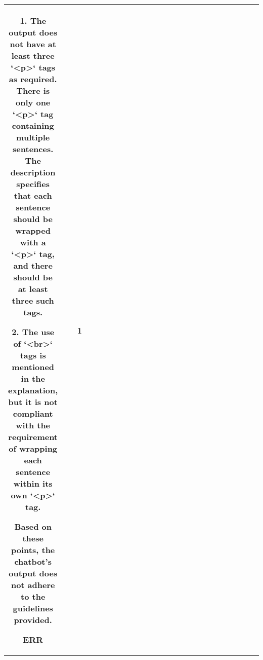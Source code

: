 \begin{table}[h!]
\begin{tabular}{|c|c|c|c|c|c|c|c|c|c|}
1. The output does not have at least three `<p>` tags as required. There is only one `<p>` tag containing multiple sentences. The description specifies that each sentence should be wrapped with a `<p>` tag, and there should be at least three such tags.

2. The use of `<br>` tags is mentioned in the explanation, but it is not compliant with the requirement of wrapping each sentence within its own `<p>` tag.

Based on these points, the chatbot's output does not adhere to the guidelines provided.

ERR & 1\\
\hline
149fa06 & b70fdc4 &  &  & llama3.2:1b & To be, or not to be, that is the question. Whether 'tis nobler in the mind to suffer. The slings and arrows of outrageous fortune. & Here is the paragraph with individual sentences wrapped in <p> tags, followed by one <strong> tag and multiple <em> tags:

<p>To be, or not to be, that is the question.</strong><p> Whether 'tis nobler in the mind to suffer. <em>This is a philosophical concern</em></p>

<p>The slings and arrows of outrageous fortune.</strong><p>Take them all and none.</em></p>
 
<p>To be, or not to be, that is the question. & err & The chatbot's output does not comply with the description provided. Here is the reasoning for this conclusion:

1. Each sentence is meant to be wrapped in a `<p>` tag. However, the first sentence "To be, or not to be, that is the question." is closed with a `</strong>` tag instead of a `</p>` tag. This indicates an error in tag placement as it appears that there is no opening `<strong>` tag here.
2. Each sentence should contain at least one `<strong>` tag. The output does contain `<strong>` tags, but their placement seems inconsistent, and they are not opened correctly. For instance, after the sentence "The slings and arrows of outrageous fortune." there is a closing `</strong>` tag without a corresponding opening `<strong>` tag.
3. The guidelines indicate that there should be multiple `<em>` tags per sentence. While the second sentence contains an `<em>` tag, the third sentence "Take them all and none." only has an `</em>` tag with no content to emphasize.
4. The sentence "To be, or not to be, that is the question." was repeated but lacks strong or emphasized content in one instance.
5. Additionally, the `<p>` tags are not correctly closed or opened consistently throughout the output.


\end{tabular}
\end{table}
